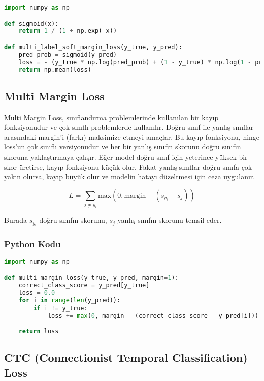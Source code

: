 \begin{lstlisting}[language=Python]
import numpy as np

def sigmoid(x):
    return 1 / (1 + np.exp(-x))

def multi_label_soft_margin_loss(y_true, y_pred):
    pred_prob = sigmoid(y_pred)
    loss = - (y_true * np.log(pred_prob) + (1 - y_true) * np.log(1 - pred_prob))
    return np.mean(loss)
\end{lstlisting}

\newpage

\subsection{Multi Margin Loss}

Multi Margin Loss, sınıflandırma problemlerinde kullanılan bir kayıp fonksiyonudur ve çok sınıflı problemlerde kullanılır. Doğru sınıf ile yanlış sınıflar arasındaki margin’i (farkı) maksimize etmeyi amaçlar. Bu kayıp fonksiyonu, hinge loss’un çok sınıflı versiyonudur ve her bir yanlış sınıfın skorunu doğru sınıfın skoruna yaklaştırmaya çalışır. Eğer model doğru sınıf için yeterince yüksek bir skor üretirse, kayıp fonksiyonu küçük olur. Fakat yanlış sınıflar doğru sınıfa çok yakın olursa, kayıp büyük olur ve modelin hatayı düzeltmesi için ceza uygulanır.

\[ L = \sum_{j \neq y_i} \text{max}(0, \text{margin} - (s_{y_i} - s_j)) \]

Burada $s_{y_i}$ doğru sınıfın skorunu, $s_j$ yanlış sınıfın skorunu temsil eder.

\subsubsection{Python Kodu}

\begin{lstlisting}[language=Python]
import numpy as np

def multi_margin_loss(y_true, y_pred, margin=1):
    correct_class_score = y_pred[y_true]
    loss = 0.0
    for i in range(len(y_pred)):
        if i != y_true:
            loss += max(0, margin - (correct_class_score - y_pred[i]))

    return loss
\end{lstlisting}

\newpage

\subsection{CTC (Connectionist Temporal Classification) Loss}

